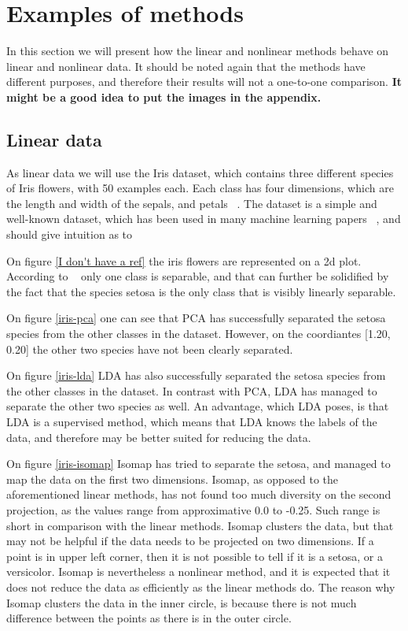 \section{Examples of methods}
In this section we will present how the linear and nonlinear methods behave on linear and nonlinear data. It should be noted again that the methods have different purposes, and therefore their results will not a one-to-one comparison.  \textbf{It might be a good idea to put the images in the appendix.}


\subsection{Linear data}
As linear data we will use the Iris dataset, which contains three different species of Iris flowers, with 50 examples each. Each class has four dimensions, which are the length and width of the sepals, and petals ~\cite{iris-dataset}. The dataset is a simple and well-known dataset, which has been used in many machine learning papers ~\cite{iris-dataset}, and should give intuition as to 


On figure \ref{I don't have a ref} the iris flowers are represented on a 2d plot. According to ~\cite{iris-dataset} only one class is separable, and that can further be solidified by the fact that the species setosa is the only class that is visibly linearly separable.


On figure \ref{iris-pca} one can see that PCA has successfully separated the setosa species from the other classes in the dataset. However, on the coordiantes [1.20, 0.20] the other two species have not been clearly separated.

On figure \ref{iris-lda} LDA has also successfully separated the setosa species from the other classes in the dataset. In contrast with PCA, LDA has managed to separate the other two species as well. An advantage, which LDA poses, is that LDA is a supervised method, which means that LDA knows the labels of the data, and therefore may be better suited for reducing the data.



On figure \ref{iris-isomap} Isomap has tried to separate the setosa, and managed to map the data on the first two dimensions. Isomap, as opposed to the aforementioned linear methods, has not found too much diversity on the second projection, as the values range from approximative 0.0 to -0.25. Such range is short in comparison with the linear methods. Isomap clusters the data, but that may not be helpful if the data needs to be projected on two dimensions. If a point is in upper left corner, then it is not possible to tell if it is a setosa, or a versicolor. Isomap is nevertheless a nonlinear method, and it is expected that it does not reduce the data as efficiently as the linear methods do. The reason why Isomap clusters the data in the inner circle, is because there is not much difference between the points as there is in the outer circle.


